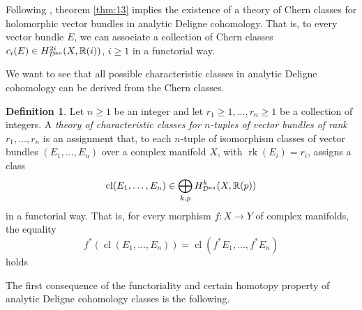 \documentclass[10pt,twoside]{article}
\numberwithin{equation}{section}
\theoremstyle{plain}
\theoremstyle{definition}
\newtheorem{definition}[equation]{Definition}
\DeclareMathOperator{\cl}{cl}
\DeclareMathOperator{\rk}{rk}
\newcommand{\an}{\text{{\rm an}}}
\begin{document}
Following \cite{Grothendieck:tcc}, theorem \ref{thm:13} implies the
existence of a theory of Chern classes for holomorphic vector bundles
in analytic Deligne cohomology. That is, to every vector bundle $E$,
we can associate a 
collection of Chern classes $c_{i}(E)\in
H^{2i}_{\mathcal{D}^{\an}}(X,\mathbb{R}(i))$, $i\ge 1$ in a functorial
way.
 
We want to see that all possible characteristic classes in analytic
Deligne cohomology can be derived from the Chern classes. 

\begin{definition} \label{def:6}
  Let $n\ge 1$ be an integer and let $r_1\ge 1,\dots ,r_n\ge 1$ be a
  collection of integers. A \emph{theory of characteristic classes
    for $n$-tuples of vector bundles of rank $r_{1},\dots ,r_{n}$} is
  an assignment that, to each 
  $n$-tuple of isomorphism classes of vector bundles $(E_{1},\dots
  ,E_{n})$ over a complex 
  manifold $X$, with
  $\rk(E_{i})=r_{i}$, assigns a class  
  $$\cl(E_{1},\dots ,E_{n})\in \bigoplus _{k,p}
  H^{k}_{\mathcal{D}^{\an}}(X,\mathbb{R}(p))$$ 
  in a functorial way. That is, for every morphism
    $f\colon X\longrightarrow Y$ of 
    complex manifolds, the equality
    \begin{displaymath}
      f^{\ast}(\cl(E_{1},\dots ,E_{n}))=
      \cl(f^{\ast} E_{1},\dots ,f^{\ast} E_{n})
    \end{displaymath}
    holds
\end{definition}

The first consequence of the functoriality and certain homotopy property
of analytic Deligne cohomology classes is the following.
\end{document}
